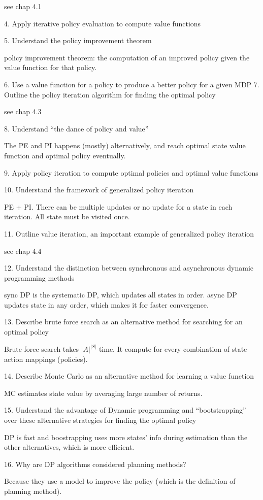 \documentclass[sutton_barto_notes.tex]{subfiles}
\begin{document}
see chap 4.1

4. Apply iterative policy evaluation to compute value functions

5. Understand the policy improvement theorem

policy improvement theorem: the computation of an improved policy given the value function for that policy.

6. Use a value function for a policy to produce a better policy for a given MDP
7. Outline the policy iteration algorithm for finding the optimal policy

see chap 4.3

8. Understand “the dance of policy and value”

The PE and PI happens (mostly) alternatively, and reach optimal state value function and optimal policy eventually.

9. Apply policy iteration to compute optimal policies and optimal value functions

10. Understand the framework of generalized policy iteration

PE + PI. There can be multiple updates or no update for a state in each iteration. All state must be visited once.

11. Outline value iteration, an important example of generalized policy iteration

see chap 4.4

12. Understand the distinction between synchronous and asynchronous dynamic programming methods

sync DP is the systematic DP, which updates all states in order. async DP updates state in any order, which makes it for faster convergence.

13. Describe brute force search as an alternative method for searching for an optimal policy

Brute-force search takes $|A|^{|S|}$ time. It compute for every combination of state-action mappings (policies).

14. Describe Monte Carlo as an alternative method for learning a value function

MC estimates state value by averaging large number of returns.

15. Understand the advantage of Dynamic programming and “bootstrapping” over these alternative strategies for finding the optimal policy

DP is fast and boostrapping uses more states' info during estimation than the other alternatives, which is more efficient.

16. Why are DP algorithms considered planning methods?

Because they use a model to improve the policy (which is the definition of planning method).
\end{document}
